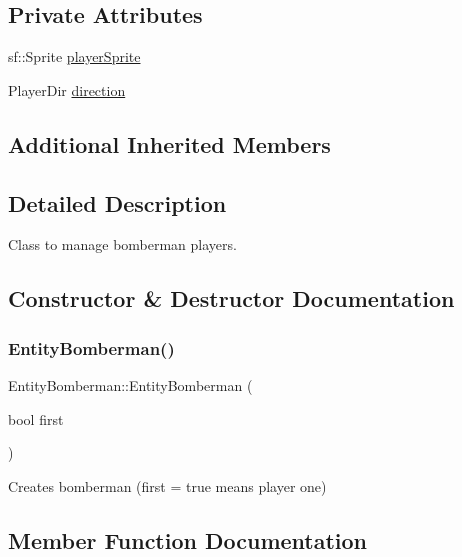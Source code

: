 \subsection*{Private Attributes}
\begin{DoxyCompactItemize}
\item 
sf\+::\+Sprite \mbox{\hyperlink{class_entity_bomberman_aeb4c8553024331c7d4d25f387c856b1d}{player\+Sprite}}
\item 
Player\+Dir \mbox{\hyperlink{class_entity_bomberman_a47768720c9807e7edd7a71f4cc536e7b}{direction}}
\end{DoxyCompactItemize}
\subsection*{Additional Inherited Members}


\subsection{Detailed Description}
Class to manage bomberman players. 

\subsection{Constructor \& Destructor Documentation}
\mbox{\label{class_entity_bomberman_aecfbe83ba3dccae03069ed5e199337b2}} 
\subsubsection{\texorpdfstring{EntityBomberman()}{EntityBomberman()}}
{\footnotesize\ttfamily Entity\+Bomberman\+::\+Entity\+Bomberman (\begin{DoxyParamCaption}\item[{bool}]{first }\end{DoxyParamCaption})}

Creates bomberman (first = true means player one) 

\subsection{Member Function Documentation}
\mbox{\label{class_entity_bomberman_a8cc4d0ad8f449ec8f15a1c11ea4b643e}} 
